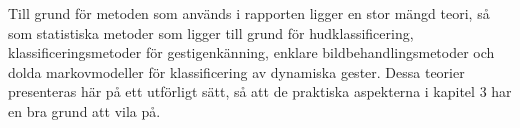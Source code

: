 \documentclass[../rapport_MVEX01-11-05]{subfiles}
\begin{document}
Till grund för metoden som används i rapporten ligger en stor mängd teori, så som
statistiska metoder som ligger till grund för hudklassificering,
klassificeringsmetoder för gestigenkänning, enklare bildbehandlingsmetoder
och dolda markovmodeller för klassificering av dynamiska gester. Dessa teorier
presenteras här på ett utförligt sätt, så att de praktiska aspekterna i
kapitel 3 har en bra grund att vila på.
\end{document}
